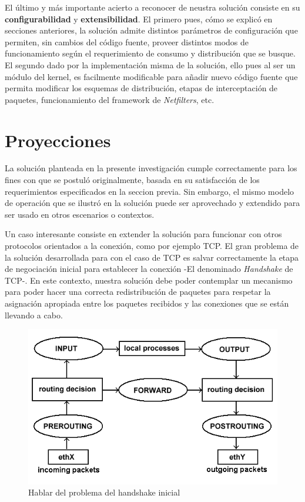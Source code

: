 El último y más importante acierto a reconocer de neustra solución consiste en su \textbf{configurabilidad} y \textbf{extensibilidad}. El primero pues, cómo se explicó en secciones anteriores, la solución admite distintos parámetros de configuración que permiten, sin cambios del código fuente, proveer distintos modos de funcionamiento según el requerimiento de consumo y distribución que se busque. El segundo dado por la implementación misma de la solución, ello pues al ser un módulo del kernel, es facilmente modificable para añadir nuevo código fuente que permita modificar los esquemas de distribución, etapas de interceptación de paquetes, funcionamiento del framework de \emph{Netfilters}, etc.

\section{Proyecciones}
La solución planteada en la presente investigación cumple correctamente para los fines con que se postuló originalmente, basada en su satisfacción de los requerimientos especificados en la seccion previa. Sin embargo, el mismo modelo de operación que se ilustró en la solución puede ser aprovechado y extendido para ser usado en otros escenarios o contextos.

Un caso interesante consiste en extender la solución para funcionar con otros protocolos orientados a la conexión, como por ejemplo TCP. El gran problema de la solución desarrollada para con el caso de TCP es salvar correctamente la etapa de negociación inicial para establecer la conexión -El denominado \emph{Handshake} de TCP-. En este contexto, nuestra solución debe poder contemplar un mecanismo para poder hacer una correcta redistribución de paquetes para respetar la asignación apropiada entre los paquetes recibidos y las conexiones que se están llevando a cabo.

\begin{figure}[!h]
	\centering
	\includegraphics[scale=.2]{imagenes/netfilterArchitecture}
	\caption{Hablar del problema del handshake inicial}
	\label{netfilterArchitecture}
\end{figure}

